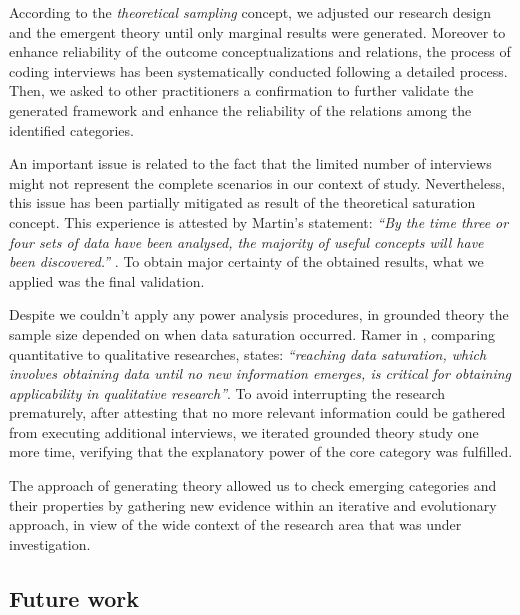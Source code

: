 \documentclass[10pt,journal,letterpaper,compsoc]{IEEEtran}
\begin{document}
According to the \textit{theoretical sampling} concept, we adjusted our research design and the emergent theory until only marginal results were generated. Moreover to enhance reliability of the outcome conceptualizations and relations, the process of coding interviews has been systematically conducted following a detailed process. Then, we asked to other practitioners a confirmation to further validate the generated framework and enhance the reliability of the relations among the identified categories.

An important issue is related to the fact that the limited number of interviews might not represent the complete scenarios in our context of study. Nevertheless, this issue has been partially mitigated as result of the theoretical saturation concept. This experience is attested by Martin's statement: \textit{``By the time three or four sets of data have been analysed, the majority of useful concepts will have been discovered.''} \cite{giardinoEtAl}. To obtain major certainty of the obtained results, what we applied was the final validation.

Despite we couldn't apply any power analysis procedures, in grounded theory the sample size depended on when data saturation occurred. Ramer in \cite{Ramer}, comparing quantitative to qualitative researches, states: \textit{``reaching data saturation, which involves obtaining data until no new information emerges, is critical for obtaining applicability in qualitative research''}. To avoid interrupting the research prematurely, after attesting that no more relevant information could be gathered from executing additional interviews, we iterated grounded theory study one more time, verifying that the explanatory power of the core category was fulfilled.

The  approach of generating theory allowed us to check emerging categories and their properties by gathering new evidence within an iterative and evolutionary approach, in view of the wide context of the research area that was under investigation.
\subsection{Future work}
\label{futwork}
\end{document}
